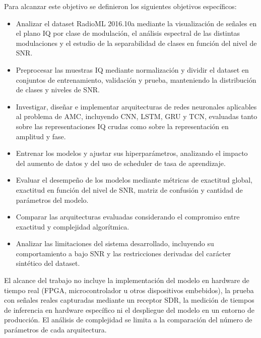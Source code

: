 Para alcanzar este objetivo se definieron los siguientes objetivos específicos:

\begin{itemize}
\item Analizar el dataset RadioML 2016.10a mediante la visualización de señales en el plano IQ por clase de modulación, el análisis espectral de las distintas modulaciones y el estudio de la separabilidad de clases en función del nivel de SNR.
\item Preprocesar las muestras IQ mediante normalización y dividir el dataset en conjuntos de entrenamiento, validación y prueba, manteniendo la distribución de clases y niveles de SNR.
\item Investigar, diseñar e implementar arquitecturas de redes neuronales aplicables al problema de AMC, incluyendo CNN, LSTM, GRU y TCN, evaluadas tanto sobre las representaciones IQ crudas como sobre la representación en amplitud y fase.
\item Entrenar los modelos y ajustar sus hiperparámetros, analizando el impacto del aumento de datos y del uso de scheduler de tasa de aprendizaje.
\item Evaluar el desempeño de los modelos mediante métricas de exactitud global, exactitud en función del nivel de SNR, matriz de confusión y cantidad de parámetros del modelo.
\item Comparar las arquitecturas evaluadas considerando el compromiso entre exactitud y complejidad algorítmica.
\item Analizar las limitaciones del sistema desarrollado, incluyendo su comportamiento a bajo SNR y las restricciones derivadas del carácter sintético del dataset.
\end{itemize}

El alcance del trabajo no incluye la implementación del modelo en hardware de tiempo real (FPGA, microcontrolador u otros dispositivos embebidos), la prueba con señales reales capturadas mediante un receptor SDR, la medición de tiempos de inferencia en hardware específico ni el despliegue del modelo en un entorno de producción. El análisis de complejidad se limita a la comparación del número de parámetros de cada arquitectura.
